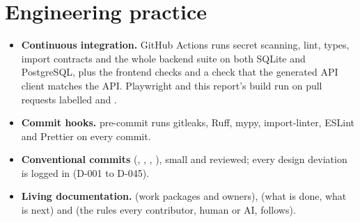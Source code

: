 \section{Engineering practice}
\begin{itemize}
  \item \textbf{Continuous integration.} GitHub Actions runs secret scanning, lint, types,
    import contracts and the whole backend suite on both SQLite and PostgreSQL, plus the
    frontend checks and a check that the generated API client matches the API. Playwright and
    this report's build run on pull requests labelled  and .
  \item \textbf{Commit hooks.} pre-commit runs gitleaks, Ruff, mypy, import-linter, ESLint and
    Prettier on every commit.
  \item \textbf{Conventional commits} (, , , ),
    small and reviewed; every design deviation is logged in  (D-001 to
    D-045).
  \item \textbf{Living documentation.}  (work packages and owners),
     (what is done, what is next) and  (the rules every
    contributor, human or AI, follows).
\end{itemize}
